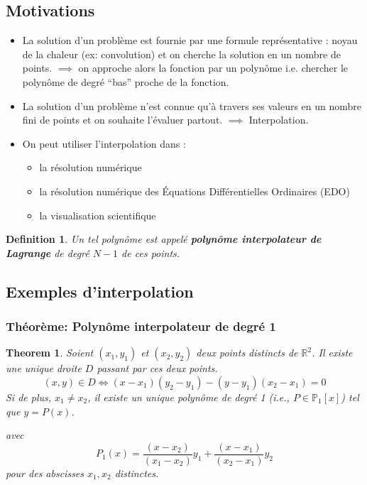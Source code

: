 \documentclass{article}
\newtheorem{theorem}{Theorem}
\newtheorem{definition}{Definition}
\begin{document}
\subsection{Motivations}

\begin{itemize}
    \item La solution d'un problème est fournie par une formule représentative : noyau de la chaleur (ex: convolution) et on cherche la solution en un nombre de points.
    $\implies$ on approche alors la fonction par un polynôme i.e. chercher le polynôme de degré ``bas'' proche de la fonction.
    \item La solution d'un problème n'est connue qu'à travers ses valeurs en un nombre fini de points et on souhaite l'évaluer partout.
    $\implies$ Interpolation.
    \item On peut utiliser l'interpolation dans :
    \begin{itemize}
        \item la résolution numérique
        \item la résolution numérique des Équations Différentielles Ordinaires (EDO)
        \item la visualisation scientifique
    \end{itemize}
\end{itemize}

\begin{definition}
Un tel polynôme est appelé \textbf{polynôme interpolateur de Lagrange} de degré $N-1$ de ces points.
\end{definition}

\subsection{Exemples d'interpolation}

\subsubsection{Théorème: Polynôme interpolateur de degré 1}

\begin{theorem}
Soient $(x_1, y_1)$ et $(x_2, y_2)$ deux points distincts de $\mathbb{R}^2$.
Il existe une unique droite $D$ passant par ces deux points.
\[
(x, y) \in D \iff (x-x_1)(y_2-y_1) - (y-y_1)(x_2-x_1) = 0
\]
Si de plus, $x_1 \neq x_2$, il existe un unique polynôme de degré 1 (i.e., $P \in \mathbb{P}_1[x]$) tel que $y = P(x)$.

avec
\[
P_1(x) = \frac{(x-x_2)}{(x_1-x_2)} y_1 + \frac{(x-x_1)}{(x_2-x_1)} y_2
\]
pour des abscisses $x_1, x_2$ distinctes.
\end{theorem}
\end{document}
